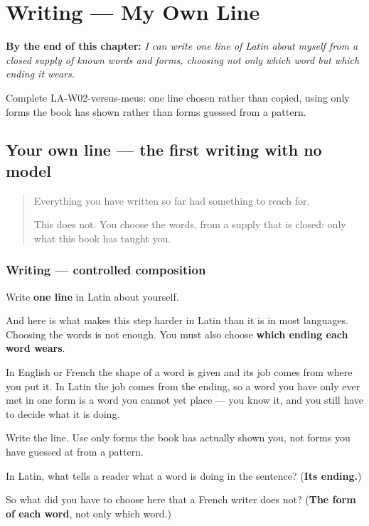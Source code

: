 
\chapter{Writing --- My Own Line}
\label{ch:la-versus-meus}

\begin{chapteropening}
\textbf{By the end of this chapter:} \emph{I can write one line of Latin about myself from a closed supply of known words and forms, choosing not only which word but which ending it wears.}

Complete LA-W02-versus-meus: one line chosen rather than copied, using only forms the book has shown rather than forms guessed from a pattern.
\end{chapteropening}

\section[(versus meus)]{Your own line — the first writing with no model}

\label{lesson:LA-W02-versus-meus}



\begin{quote}
Everything you have written so far had something to reach for.

This does not. You choose the words, from a supply that is closed: only what this book has taught you.
\end{quote}

\subsection*{Writing — controlled composition}
Write \textbf{one line} in Latin about yourself.

And here is what makes this step harder in Latin than it is in most languages. Choosing the words is not enough. You must also choose \textbf{which ending each word wears}.

In English or French the shape of a word is given and its job comes from where you put it. In Latin the job comes from the ending, so a word you have only ever met in one form is a word you cannot yet place — you know it, and you still have to decide what it is doing.

Write the line. Use only forms the book has actually shown you, not forms you have guessed at from a pattern.

\begin{tcolorbox}[breakable,colback=teal!4,colframe=teal!35!black,title={Before you move on}]
In Latin, what tells a reader what a word is doing in the sentence? (\textbf{Its ending.})

So what did you have to choose here that a French writer does not? (\textbf{The form of each word}, not only which word.)
\end{tcolorbox}
